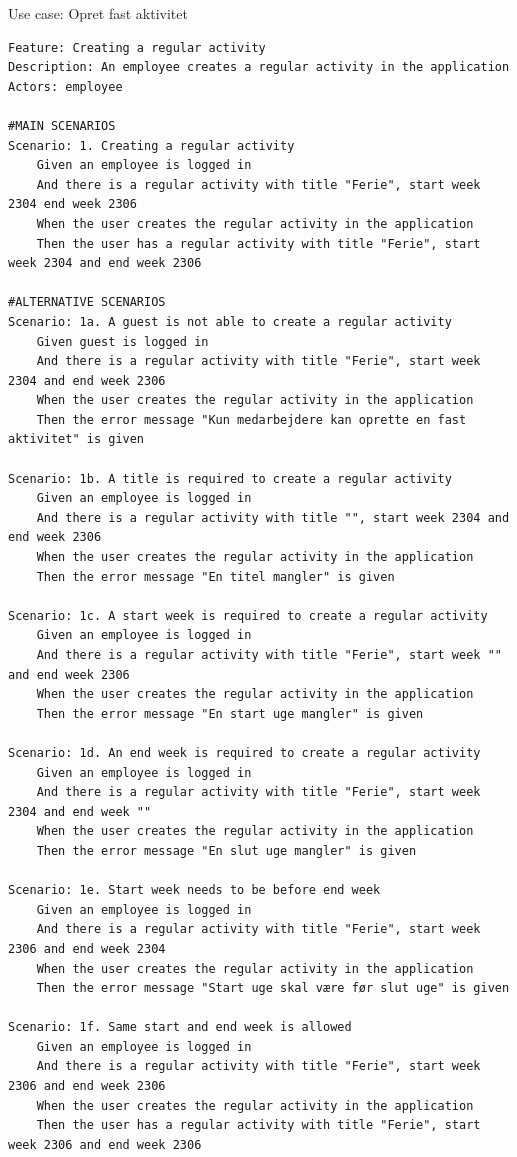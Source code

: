\begin{listing}[H]
    \centering
    \caption{Use case: Opret fast aktivitet}\label{lst:usecase_regular_activity}
    \begin{verbatim}  
Feature: Creating a regular activity
Description: An employee creates a regular activity in the application
Actors: employee

#MAIN SCENARIOS
Scenario: 1. Creating a regular activity
    Given an employee is logged in
    And there is a regular activity with title "Ferie", start week 2304 end week 2306 
    When the user creates the regular activity in the application 
    Then the user has a regular activity with title "Ferie", start week 2304 and end week 2306

#ALTERNATIVE SCENARIOS
Scenario: 1a. A guest is not able to create a regular activity
    Given guest is logged in
    And there is a regular activity with title "Ferie", start week 2304 and end week 2306   
    When the user creates the regular activity in the application 
    Then the error message "Kun medarbejdere kan oprette en fast aktivitet" is given

Scenario: 1b. A title is required to create a regular activity
    Given an employee is logged in
    And there is a regular activity with title "", start week 2304 and end week 2306 
    When the user creates the regular activity in the application 
    Then the error message "En titel mangler" is given

Scenario: 1c. A start week is required to create a regular activity
    Given an employee is logged in
    And there is a regular activity with title "Ferie", start week "" and end week 2306 
    When the user creates the regular activity in the application 
    Then the error message "En start uge mangler" is given

Scenario: 1d. An end week is required to create a regular activity
    Given an employee is logged in
    And there is a regular activity with title "Ferie", start week 2304 and end week "" 
    When the user creates the regular activity in the application 
    Then the error message "En slut uge mangler" is given

Scenario: 1e. Start week needs to be before end week
    Given an employee is logged in
    And there is a regular activity with title "Ferie", start week 2306 and end week 2304 
    When the user creates the regular activity in the application 
    Then the error message "Start uge skal være før slut uge" is given

Scenario: 1f. Same start and end week is allowed
    Given an employee is logged in
    And there is a regular activity with title "Ferie", start week 2306 and end week 2306 
    When the user creates the regular activity in the application 
    Then the user has a regular activity with title "Ferie", start week 2306 and end week 2306
    \end{verbatim}
\end{listing}
